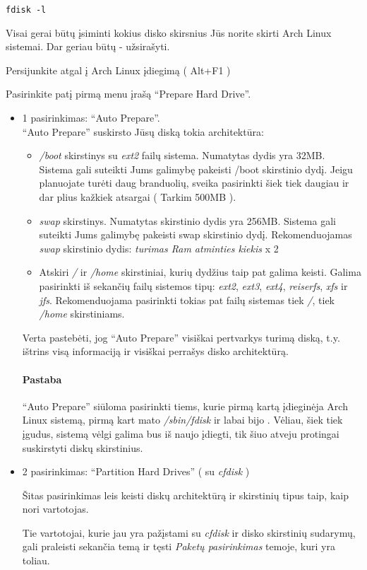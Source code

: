 \begin{verbatim}
fdisk -l
\end{verbatim}

Visai gerai būtų įsiminti kokius disko skirsnius Jūs norite skirti
Arch Linux sistemai. Dar geriau būtų - užsirašyti.

Persijunkite atgal į Arch Linux įdiegimą ( Alt+F1 )

Pasirinkite patį pirmą menu įrašą ``Prepare Hard Drive''.

\begin{itemize}
  \item 1 pasirinkimas: ``Auto Prepare''.\\
    ``Auto Prepare'' suskirsto Jūsų diską tokia architektūra:
    \begin{itemize}
      \item \textsl{/boot} skirstinys su \textsl{ext2} failų
        sistema. Numatytas dydis yra 32MB. Sistema gali suteikti Jums
        galimybę pakeisti /boot skirstinio dydį.
        Jeigu planuojate turėti daug branduolių, sveika pasirinkti
        šiek tiek daugiau ir dar plius kažkiek atsargai ( Tarkim 500MB
        ).
      \item \textsl{swap} skirstinys. Numatytas skirstinio dydis yra
        256MB. Sistema gali suteikti Jums galimybę pakeisti
        \textsf{swap} skirstinio dydį. Rekomenduojamas \textsl{swap}
        skirstinio dydis: \textsl{turimas Ram atminties kiekis} x 2
      \item Atskiri \textsl{/} ir \textsl{/home} skirstiniai, kurių
        dydžius taip pat galima keisti. Galima pasirinkti iš sekančių
        failų sistemos tipų: \textsl{ext2}, \textsl{ext3}, \textsl{ext4},
        \textsl{reiserfs}, \textsl{xfs} ir
        \textsl{jfs}. Rekomenduojama pasirinkti tokias pat failų
        sistemas tiek \textsl{/}, tiek \textsl{/home} skirstiniams.
    \end{itemize}
    Verta pastebėti, jog ``Auto Prepare'' visiškai pertvarkys turimą
    diską, t.y. ištrins visą informaciją ir visiškai perrašys disko
    architektūrą.

    \paragraph{Pastaba}

    ``Auto Prepare'' siūloma pasirinkti tiems, kurie pirmą kartą
    įdieginėja Arch Linux sistemą, pirmą kart mato
    \textsl{/sbin/fdisk} ir labai bijo . Vėliau, šiek tiek įgudus, sistemą
    vėlgi galima bus iš naujo įdiegti, tik šiuo atveju protingai
    suskirstyti diskų skirstinius.

  \item 2 pasirinkimas: ``Partition Hard Drives'' ( su \textsl{cfdisk}
    )

    Šitas pasirinkimas leis keisti diskų architektūrą ir skirstinių
    tipus taip, kaip nori vartotojas.

    Tie vartotojai, kurie jau yra pažįstami su \textsl{cfdisk} ir
    disko skirstinių sudarymų, gali praleisti sekančia temą ir tęsti
    \textsl{Paketų pasirinkimas} temoje, kuri yra toliau.

\end{itemize}

